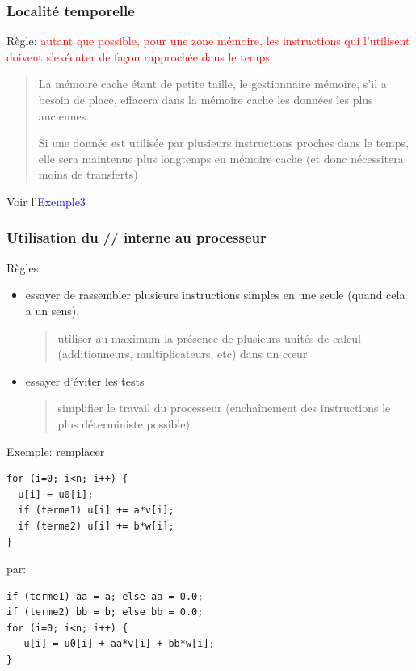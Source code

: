 \documentclass{beamer}
\begin{document}
\begin{frame}
\frametitle{Localit\'e temporelle}
Règle: 
	\textcolor{red}{autant que possible, pour une zone m\'emoire, les instructions qui l'utilisent doivent s'ex\'ecuter de façon rapproch\'ee dans le temps}
	\vfill
	
	\begin{quote}
		La m\'emoire cache \'etant de petite taille, le gestionnaire m\'emoire, s'il a besoin de place, effacera dans la m\'emoire cache les donn\'ees les plus anciennes.
		
		Si une donn\'ee est utilis\'ee par plusieurs instructions proches dans le temps, elle sera maintenue plus longtemps en m\'e\-moi\-re cache (et donc n\'ecessitera moins de transferts)
	\end{quote}

\vfill
Voir l'\textcolor{blue}{Exemple3}
\end{frame}

\begin{frame}[fragile]
\frametitle{Utilisation du // interne au processeur}
Règles: 
\begin{itemize}
	\item essayer de rassembler plusieurs instructions simples en une seule (quand cela a un sens),
	\begin{quote}
		utiliser au maximum la pr\'esence de plusieurs unit\'es de calcul (additionneurs, multiplicateurs, etc) dans un c\oe ur
	\end{quote}
	\item  essayer d'\'eviter les tests
	\begin{quote}
		simplifier le travail du processeur (encha\^{i}nement des instructions le plus d\'eterministe possible).
	\end{quote}
\end{itemize}


\end{frame}

\begin{frame}[fragile]
Exemple: remplacer
\begin{lstlisting}
for (i=0; i<n; i++) {
  u[i] = u0[i];
  if (terme1) u[i] += a*v[i];
  if (terme2) u[i] += b*w[i];
}
\end{lstlisting}

par:
\begin{lstlisting}
if (terme1) aa = a; else aa = 0.0;
if (terme2) bb = b; else bb = 0.0;
for (i=0; i<n; i++) {
   u[i] = u0[i] + aa*v[i] + bb*w[i];
}
\end{lstlisting}

\end{frame}
\end{document}
